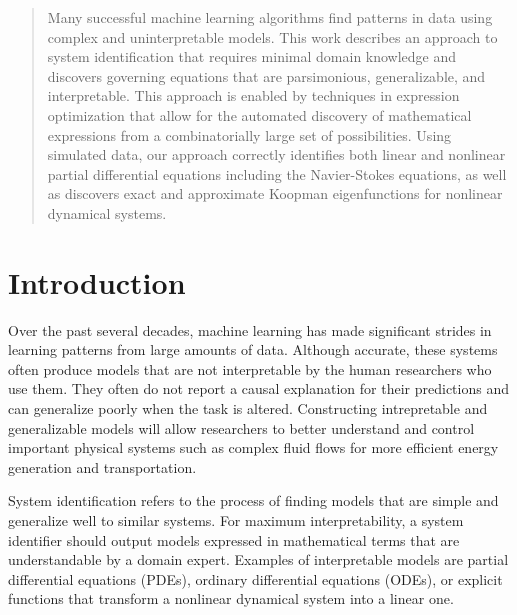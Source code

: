 \documentclass{article}
\begin{document}
\begin{abstract}
Many successful machine learning algorithms find patterns in data using complex and uninterpretable models. This work describes an approach to system identification that requires minimal domain knowledge and discovers governing equations that are parsimonious, generalizable, and interpretable. This approach is enabled by techniques in expression optimization that allow for the automated discovery of mathematical expressions from a combinatorially large set of possibilities. Using simulated data, our approach correctly identifies both linear and nonlinear partial differential equations including the Navier-Stokes equations, as well as discovers exact and approximate Koopman eigenfunctions for nonlinear dynamical systems. 
\end{abstract}

\section{Introduction}
\label{introduction}

Over the past several decades, machine learning has made significant strides in learning patterns from large amounts of data. Although accurate, these systems often produce models that are not interpretable by the human researchers who use them. They often do not report a causal explanation for their predictions and can generalize poorly when the task is altered. Constructing intrepretable and generalizable models will allow researchers to better understand and control important physical systems such as complex fluid flows for more efficient energy generation and transportation.


System identification refers to the process of finding models that are simple and generalize well to similar systems. For maximum interpretability, a system identifier should output models expressed in mathematical terms that are understandable by a domain expert. Examples of interpretable models are partial differential equations (PDEs), ordinary differential equations (ODEs), or explicit functions that transform a nonlinear dynamical system into a linear one. 
\end{document}
